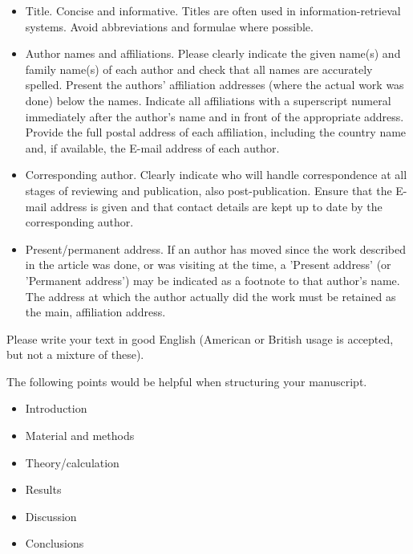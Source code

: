\documentclass{techmech}
\begin{document}
\begin{itemize}
\item Title. Concise and informative. Titles are often used in information-retrieval systems. Avoid
abbreviations and formulae where possible.
\item Author names and affiliations. Please clearly indicate the given name(s) and family name(s)
of each author and check that all names are accurately spelled. Present the authors' affiliation
addresses (where the actual work was done) below the names. Indicate all affiliations with a superscript numeral immediately after the author's name and in front of the appropriate address.
Provide the full postal address of each affiliation, including the country name and, if available, the
E-mail address of each author.
\item Corresponding author. Clearly indicate who will handle correspondence at all stages of reviewing
and publication, also post-publication. Ensure that the E-mail address is given and that contact
details are kept up to date by the corresponding author.
\item Present/permanent address. If an author has moved since the work described in the article was
done, or was visiting at the time, a 'Present address' (or 'Permanent address') may be indicated as
a footnote to that author's name. The address at which the author actually did the work must be
retained as the main, affiliation address. 
\end{itemize}


Please write your text in good English (American or British usage is accepted, but not a mixture of
these).\pagebreak

The following points would be helpful when structuring your manuscript.
\begin{itemize}
\item Introduction
\item Material and methods
\item Theory/calculation
\item Results
\item Discussion
\item Conclusions
\end{itemize}

\end{document}
